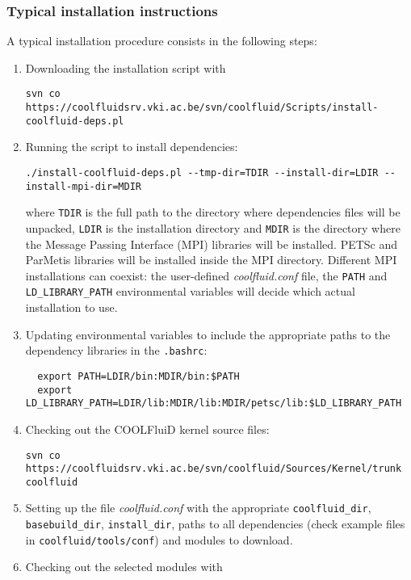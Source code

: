\documentclass[11pt]{article}
\begin{document}
\subsubsection{Typical installation instructions}

A typical installation procedure consists in the following steps:

\begin{enumerate}
\item 
  Downloading the installation script with
\begin{verbatim}
svn co https://coolfluidsrv.vki.ac.be/svn/coolfluid/Scripts/install-coolfluid-deps.pl
\end{verbatim}
\item
  Running the script to install dependencies:
\begin{verbatim}
./install-coolfluid-deps.pl --tmp-dir=TDIR --install-dir=LDIR --install-mpi-dir=MDIR
\end{verbatim}
  where \texttt{TDIR} is the full path to the directory where dependencies files will be unpacked,
  \texttt{LDIR} is the installation directory and \texttt{MDIR} is the directory where the 
  Message Passing Interface (MPI) libraries will be installed. PETSc and ParMetis libraries will be installed 
  inside the MPI directory. Different MPI installations can coexist: the user-defined \textit{coolfluid.conf} file,
  the \texttt{PATH} and \texttt{LD\_LIBRARY\_PATH} environmental variables will decide which actual installation to use.
\item
  Updating environmental variables to include the appropriate paths to the dependency libraries 
  in the \texttt{.bashrc}:
\begin{verbatim}
  export PATH=LDIR/bin:MDIR/bin:$PATH
  export LD_LIBRARY_PATH=LDIR/lib:MDIR/lib:MDIR/petsc/lib:$LD_LIBRARY_PATH
\end{verbatim}  
\item
  Checking out the COOLFluiD kernel source files:
\begin{verbatim}
svn co https://coolfluidsrv.vki.ac.be/svn/coolfluid/Sources/Kernel/trunk coolfluid
\end{verbatim}
\item
  Setting up the file \textit{coolfluid.conf} with the appropriate \texttt{coolfluid\_dir},
  \texttt{basebuild\_dir}, \texttt{install\_dir}, paths to all dependencies (check example files in 
  \texttt{coolfluid/tools/conf}) and modules to download.
\item
  Checking out the selected modules with

\end{enumerate}
\end{document}
